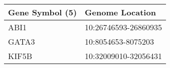 \begin{tabular}{ll}
\toprule
Gene Symbol (5) &      Genome Location \\
\midrule
           ABI1 & 10:26746593-26860935 \\
          GATA3 &   10:8054653-8075203 \\
          KIF5B & 10:32009010-32056431 \\
\bottomrule
\end{tabular}
